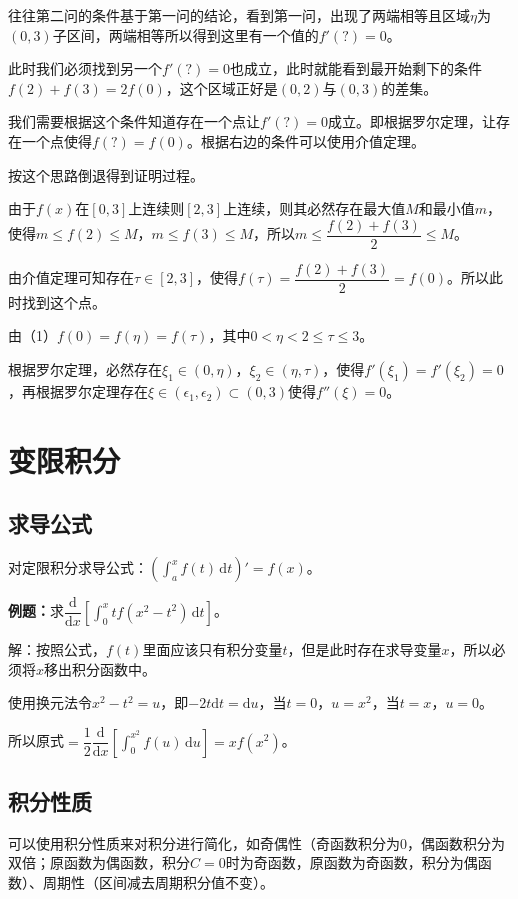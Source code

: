 \documentclass[UTF8, 12pt]{ctexart}
\begin{document}
往往第二问的条件基于第一问的结论，看到第一问，出现了两端相等且区域$\eta$为$(0,3)$子区间，两端相等所以得到这里有一个值的$f'(?)=0$。

此时我们必须找到另一个$f'(?)=0$也成立，此时就能看到最开始剩下的条件$f(2)+f(3)=2f(0)$，这个区域正好是$(0,2)$与$(0,3)$的差集。

我们需要根据这个条件知道存在一个点让$f'(?)=0$成立。即根据罗尔定理，让存在一个点使得$f(?)=f(0)$。根据右边的条件可以使用介值定理。

按这个思路倒退得到证明过程。

由于$f(x)$在$[0,3]$上连续则$[2,3]$上连续，则其必然存在最大值$M$和最小值$m$，使得$m\leqslant f(2)\leqslant M$，$m\leqslant f(3)\leqslant M$，所以$m\leqslant\dfrac{f(2)+f(3)}{2}\leqslant M$。

由介值定理可知存在$\tau\in[2,3]$，使得$f(\tau)=\dfrac{f(2)+f(3)}{2}=f(0)$。所以此时找到这个点。

由（1）$f(0)=f(\eta)=f(\tau)$，其中$0<\eta<2\leqslant\tau\leqslant3$。

根据罗尔定理，必然存在$\xi_1\in(0,\eta)$，$\xi_2\in(\eta,\tau)$，使得$f'(\xi_1)=f'(\xi_2)=0$，再根据罗尔定理存在$\xi\in(\epsilon_1,\epsilon_2)\subset(0,3)$使得$f''(\xi)=0$。

\section{变限积分}

\subsection{求导公式}

对定限积分求导公式：$(\int_a^xf(t)\,\textrm{d}t)'=f(x)$。

\textbf{例题：}求$\dfrac{\textrm{d}}{\textrm{d}x}[\int_0^xtf(x^2-t^2)\,\textrm{d}t]$。

解：按照公式，$f(t)$里面应该只有积分变量$t$，但是此时存在求导变量$x$，所以必须将$x$移出积分函数中。

使用换元法令$x^2-t^2=u$，即$-2t\textrm{d}t=\textrm{d}u$，当$t=0$，$u=x^2$，当$t=x$，$u=0$。

所以原式$=\dfrac{1}{2}\dfrac{\textrm{d}}{\textrm{d}x}[\int_0^{x^2}f(u)\,\textrm{d}u]=xf(x^2)$。

\subsection{积分性质}

可以使用积分性质来对积分进行简化，如奇偶性（奇函数积分为0，偶函数积分为双倍；原函数为偶函数，积分$C=0$时为奇函数，原函数为奇函数，积分为偶函数）、周期性（区间减去周期积分值不变）。
\end{document}
